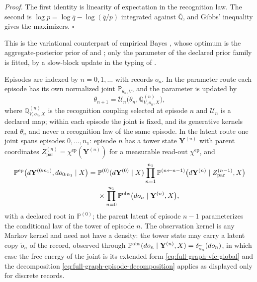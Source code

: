 \noindent\emph{Proof.}
The first identity is linearity of expectation in the recognition law. The second is
$\log p=\log\bar q-\log(\bar q/p)$ integrated against $\bar{\mathbb Q}$, and Gibbs'
inequality gives the maximizers. $\square$

This is the variational counterpart of empirical Bayes \citep{Robbins1956}, whose
optimum is the aggregate-posterior prior of \citet{HoffmanJohnson2016} and
\citet{TomczakWelling2018}; only the parameter of the declared prior family is fitted,
by a slow-block update in the typing of .

Episodes are indexed by $n=0,1,\ldots$ with records $o_n$. In the parameter route each
episode has its own normalized joint $\mathbb P_{\theta_n,V}$, and the parameter is
updated by
\begin{equation}
\theta_{n+1}=\mathcal U_n\bigl(\theta_n,\mathbb Q^{(n)}_{V,o_n,X}\bigr),
\label{eq:obs-episode-update}
\end{equation}
where $\mathbb Q^{(n)}_{V,o_n,X}$ is the recognition coupling selected at episode $n$
and $\mathcal U_n$ is a declared map; within each episode the joint is fixed, and its
generative kernels read $\theta_n$ and never a recognition law of the same episode. In
the latent route one joint spans episodes $0,\ldots,n_1$: episode $n$ has a tower state
$\mathbf Y^{(n)}$ with parent coordinates $Z^{(n)}_{\mathrm{par}}=\chi^{\mathrm{ep}}(\mathbf Y^{(n)})$
for a measurable read-out $\chi^{\mathrm{ep}}$, and
\begin{equation}
\begin{aligned}
\mathbb P^{\mathrm{ep}}\bigl(d\mathbf Y^{(0:n_1)},do_{0:n_1}\mid X\bigr)
={}&\mathbb P^{(0)}(d\mathbf Y^{(0)}\mid X)
\prod_{n=1}^{n_1}\mathbb P^{(n\leftarrow n-1)}\bigl(d\mathbf Y^{(n)}\mid Z^{(n-1)}_{\mathrm{par}},X\bigr)\\
&\times\prod_{n=0}^{n_1}\mathbb P^{\mathrm{obs}}\bigl(do_n\mid\mathbf Y^{(n)},X\bigr),
\end{aligned}
\label{eq:full-graph-episode-joint}
\end{equation}
with a declared root in $\mathbb P^{(0)}$; the parent latent of episode $n-1$
parameterizes the conditional law of the tower of episode $n$. The observation
kernel is any Markov kernel and need not have a density: the tower state may carry
a latent copy $\widetilde o_n$ of the record, observed through
$\mathbb P^{\mathrm{obs}}(do_n\mid\mathbf Y^{(n)},X)=\delta_{\widetilde o_n}(do_n)$,
in which case the free energy of the joint is its extended form
\eqref{eq:full-graph-vfe-global} and the decomposition
\eqref{eq:full-graph-episode-decomposition} applies as displayed only for discrete
records.

